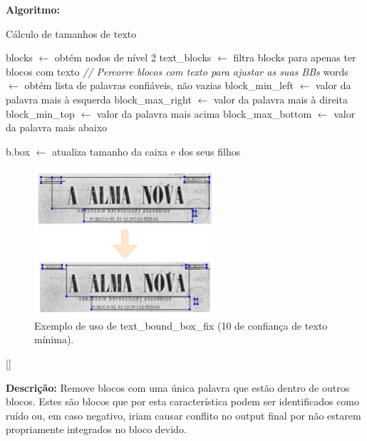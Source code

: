 \textbf{Algoritmo:}

\begin{breakablealgorithm}
	\caption{Cálculo de tamanhos de texto}
	\begin{algorithmic}[1]
		
		\State blocks $\leftarrow$ obtém nodos de nível 2
		\State text\_blocks $\leftarrow$ filtra blocks para apenas ter blocos com texto
		\State \textit{// Percorre blocos com texto para ajustar as suas BBs}
			\State words $\leftarrow$ obtém lista de palavras confiáveis, não vazias
			\State block\_min\_left $\leftarrow$ valor da palavra mais à esquerda
			\State block\_max\_right $\leftarrow$ valor da palavra mais à direita
			\State block\_min\_top $\leftarrow$ valor da palavra mais acima
			\State block\_max\_bottom $\leftarrow$ valor da palavra mais abaixo
			
				\State b.box $\leftarrow$ atualiza tamanho da caixa e dos seus filhos
			\EndIf
		\EndFor

		
	\end{algorithmic}
\end{breakablealgorithm}


\begin{figure}[H]
	\centering
	\includegraphics[width=0.6\textwidth]{images/ilustracoes/text_bound_box_fix_blocks.png}
	\caption{Exemplo de uso de text\_bound\_box\_fix (10 de confiança de texto mínima).}
	\label{fig:text_bound_box_fix_blocks}
\end{figure}



[\normalsize]

\textbf{Descrição:} Remove blocos com uma única palavra que estão dentro de outros blocos. Estes são blocos que por esta característica podem ser identificados como ruído ou, em caso negativo, iriam causar conflito no output final por não estarem propriamente integrados no bloco devido.

